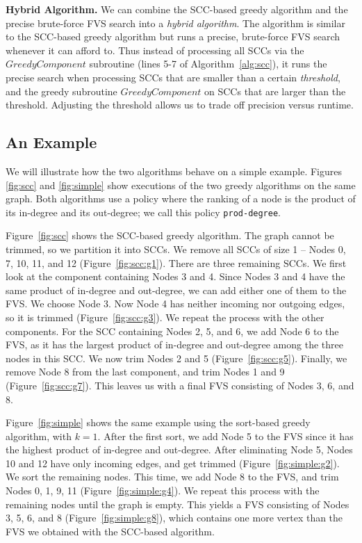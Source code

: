 {\bf Hybrid Algorithm.}
We can combine the SCC-based greedy algorithm and the precise brute-force FVS search into a \emph{hybrid algorithm}. The algorithm is similar to the SCC-based greedy algorithm but runs a precise, brute-force FVS search whenever it can afford to. Thus instead of processing all SCCs via the $GreedyComponent$ subroutine (lines 5-7 of Algorithm~\ref{alg:scc}), it runs the precise search when processing SCCs that are smaller than a certain \emph{threshold}, and the greedy subroutine $GreedyComponent$ on SCCs that are larger than the threshold. Adjusting the threshold allows us to trade off precision versus runtime.


\subsection{An Example}\label{subsec:alg_example}

We will illustrate how the two algorithms behave on a simple example. Figures \ref{fig:scc} and \ref{fig:simple} show executions of the two greedy algorithms on the same graph. Both algorithms use a policy where the ranking of a node is the product of its in-degree and its out-degree; we call this policy \texttt{prod-degree}.

Figure~\ref{fig:scc} shows the SCC-based greedy algorithm. The graph cannot be trimmed, so we partition it into SCCs. We remove all SCCs of size 1 --  Nodes 0, 7, 10, 11, and 12 (Figure~\ref{fig:scc:g1}). There are three remaining SCCs. We first look at the component containing Nodes 3 and 4. Since Nodes 3 and 4 have the same product of in-degree and out-degree, we can add either one of them to the FVS. We choose Node 3. Now Node 4 has neither incoming nor outgoing edges, so it is trimmed (Figure~\ref{fig:scc:g3}). We repeat the process with the other components. For the SCC containing Nodes 2, 5, and 6, we add Node 6 to the FVS, as it has the largest product of in-degree and out-degree among the three nodes in this SCC. We now trim Nodes 2 and 5 (Figure~\ref{fig:scc:g5}). Finally, we remove Node 8 from the last component, and trim Nodes 1 and 9 (Figure~\ref{fig:scc:g7}). This leaves us with a final FVS consisting of Nodes 3, 6, and 8.

Figure~\ref{fig:simple} shows the same example using the sort-based greedy algorithm, with $k = 1$. After the first sort, we add Node 5 to the FVS since it has the highest product of in-degree and out-degree. After eliminating Node 5, Nodes 10 and 12 have only incoming edges, and get trimmed (Figure~\ref{fig:simple:g2}). We sort the remaining nodes. This time, we add Node 8 to the FVS, and trim Nodes 0, 1, 9, 11 (Figure~\ref{fig:simple:g4}). We repeat this process with the remaining nodes until the graph is empty. This yields a FVS consisting of Nodes 3, 5, 6, and 8 (Figure~\ref{fig:simple:g8}), which contains one more vertex than the FVS we obtained with the SCC-based algorithm.


